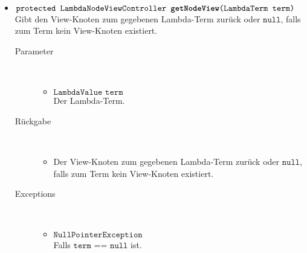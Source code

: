 \begin{description}
\begin{itemize}
		\item $\texttt{protected LambdaNodeViewController \textbf{getNodeView}(LambdaTerm term)}$ \\ Gibt den View-Knoten zum gegebenen Lambda-Term zurück oder $\texttt{null}$, falls zum Term kein View-Knoten existiert.
		\begin{description}
			\item[Parameter] \hfill \\
			\vspace{-.8cm}
			\begin{itemize}
				\item $\texttt{LambdaValue term}$ \\ Der Lambda-Term.
			\end{itemize}
			\item[Rückgabe] \hfill \\
			\vspace{-.8cm}
			\begin{itemize}
				\item Der View-Knoten zum gegebenen Lambda-Term zurück oder $\texttt{null}$, falls zum Term kein View-Knoten existiert.
			\end{itemize}
			\item[Exceptions] \hfill \\
			\vspace{-.8cm}
			\begin{itemize}
				\item $\texttt{NullPointerException}$ \\ Falls $\texttt{term == null}$ ist.
			\end{itemize}
		\end{description}
		

\end{itemize}
\end{description}
